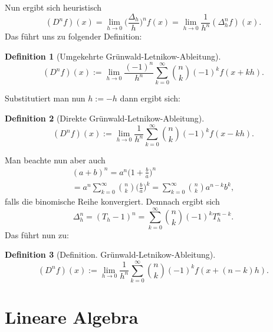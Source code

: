 \documentclass[a4paper,10pt,fleqn,twocolumn,twoside]{scrartcl}
\numberwithin{equation}{section}
\theoremstyle{rmbox}
\newtheorem{definition}{Definition}
\begin{document}
Nun ergibt sich heuristisch
\begin{equation}
(D^n f)(x) = \lim_{h\to 0} \bigg(\frac{\Delta_h}{h}\bigg)^n f(x)
= \lim_{h\to 0}\frac{1}{h^n} (\Delta_h^n f)(x).
\end{equation}
Das führt uns zu folgender Definition:
\begin{definition}[Umgekehrte Grünwald-Letnikow-Ableitung]
\begin{equation}
(D^n f)(x) := \lim_{h\to 0}
\frac{(-1)^n}{h^n} \sum_{k=0}^\infty \binom{n}{k} (-1)^k f(x+kh).
\end{equation}
\end{definition}
Substitutiert man nun $h:=-h$ dann ergibt sich:
\begin{definition}[Direkte Grünwald-Letnikow-Ableitung]
\begin{equation}
(D^n f)(x) := \lim_{h\to 0}
\frac{1}{h^n} \sum_{k=0}^\infty \binom{n}{k} (-1)^k f(x-kh).
\end{equation}
\end{definition}
Man beachte nun aber auch
\begin{gather}
(a+b)^n = a^n \bigg(1+\frac{b}{a}\bigg)^n\\
= a^n\sum_{k=0}^\infty \binom{n}{k}\bigg(\frac{b}{a}\bigg)^k
= \sum_{k=0}^\infty \binom{n}{k} a^{n-k}b^k,
\end{gather}
falls die binomische Reihe konvergiert. Demnach ergibt sich%
\begin{equation}
\Delta_h^n = (T_h-1)^n = \sum_{k=0}^\infty \binom{n}{k}(-1)^k T_h^{n-k}.
\end{equation}
Das führt nun zu:
\begin{definition}[Definition. Grünwald-Letnikow-Ableitung]
\begin{equation}
(D^n f)(x) := \lim_{h\to 0}
\frac{1}{h^n} \sum_{k=0}^\infty \binom{n}{k} (-1)^k f(x+(n-k)h).
\end{equation}
\end{definition}

\section{Lineare Algebra}
\end{document}
